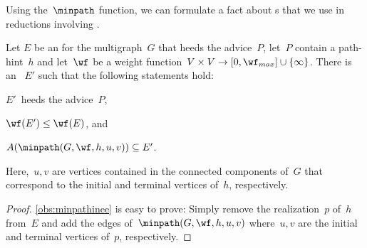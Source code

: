 Using the~$\minpath$ function, we can formulate a fact about \EE s that we use in reductions involving \pWMEEAs{}.
\begin{observation}\label{obs:minpathinee}
  Let $E$ be an \EE{} for the multigraph~$G$ that heeds the advice~$P$, let~$P$ contain a path-hint~$h$ and let~$\wf$ be a weight function~$V \times V \rightarrow [0, \wf_{max}]\cup \{\infty\}$. There is an \EE{}~$E'$ such that the following statements hold:
  \begin{lemenum}
  \item $E'$~heeds the advice~$P$,
  \item $\wf(E') \leq \wf(E)$, and 
  \item $A(\minpath(G, \wf, h, u, v)) \subseteq E'$.
  \end{lemenum}
  Here,~$u, v$ are vertices contained in the connected components of~$G$ that correspond to the initial and terminal vertices of~$h$, respectively.
\end{observation}
\begin{proof}
  \autoref{obs:minpathinee} is easy to prove: Simply remove the realization~$p$ of~$h$ from~$E$ and add the edges of~$\minpath(G, \wf, h, u, v)$ where~$u, v$ are the initial and terminal vertices of~$p$, respectively.
\end{proof}

